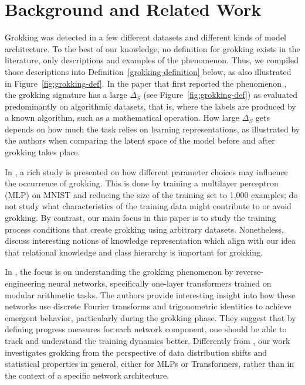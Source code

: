\section{Background and Related Work}
\label{sec:background}
Grokking was detected in a few different datasets and different kinds of model architecture. To the best of our knowledge, no definition for grokking exists in the literature, only descriptions and examples of the phenomenon.
Thus, we compiled those descriptions into Definition~\ref{grokking-definition} below, as also illustrated in Figure~\ref{fig:grokking-def}. In the paper that first reported the phenomenon \cite{Grokking}, the grokking signature has a large $\Delta_S$ (see Figure~\ref{fig:grokking-def}) as evaluated predominantly on algorithmic datasets, that is, where the labels are produced by a known algorithm, such as a mathematical operation. How large $\Delta_S$ gets depends on how much the task relies on learning representations, as illustrated by the authors when comparing the latent space of the model before and after grokking takes place. 

In \cite{liu2022Grokking}, a rich study is presented on how different parameter choices may influence the occurrence of grokking. This is done by training a multilayer perceptron (MLP) on MNIST and reducing the size of the training set to 1,000 examples; \cite{liu2022Grokking} do not study what characteristics of the training data might contribute to or avoid grokking. By contrast, our main focus in this paper is to study the training process conditions that create grokking using arbitrary datasets. Nonetheless, \cite{liu2022Grokking} discuss interesting notions of knowledge representation which align with our idea that relational knowledge and class hierarchy is important for grokking.     

In \citet{nanda2023GrokkingProgress}, the focus is on understanding the grokking phenomenon by reverse-engineering neural networks, specifically one-layer transformers trained on modular arithmetic tasks. %
The authors provide interesting insight into how these networks use discrete Fourier transforms and trigonometric identities to achieve emergent behavior, particularly during the grokking phase. They suggest that by defining progress measures for each network component, one should be able to track and understand the training dynamics better. %
Differently from \citet{nanda2023GrokkingProgress}, our work investigates grokking from the perspective of data distribution shifts and statistical properties in general, either for MLPs or Transformers, rather than in the context of a specific network architecture. %

